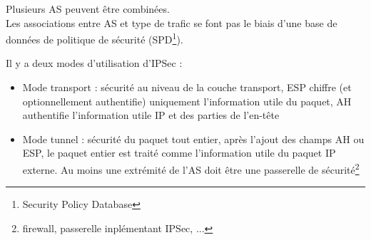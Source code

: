 \documentclass[journal, a4paper]{IEEEtran}
\begin{document}
	Plusieurs AS peuvent être combinées.\\
	Les associations entre AS et type de trafic se font pas le biais d'une base de données de politique de sécurité (SPD\footnote{Security Policy Database}).
	
	Il y a deux modes d'utilisation d'IPSec :
	\begin{itemize}
		\item Mode transport : sécurité au niveau de la couche transport, ESP chiffre (et optionnellement authentifie) uniquement l'information utile du paquet, AH authentifie l'information utile IP et des parties de l'en-tête
		\item Mode tunnel : sécurité du paquet tout entier, après l'ajout des champs AH ou ESP, le paquet entier est traité comme l'information utile du paquet IP externe. Au moins une extrémité de l'AS doit être une passerelle de sécurité\footnote{firewall, passerelle inplémentant IPSec, ...}
	\end{itemize}

	
\end{document}
